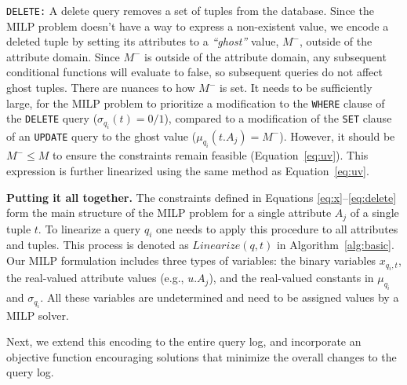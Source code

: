 \smallskip
\noindent
\texttt{DELETE:}
A delete query removes a set of tuples from the database.  
Since the MILP problem doesn't have a way to express a non-existent value,
we encode a deleted tuple by setting its attributes to a
\emph{``ghost''} value, $M^-$, outside of the attribute domain. Since $M^-$ is
outside of the attribute domain, any subsequent conditional functions will
evaluate to false, so subsequent queries do not affect ghost tuples. There are
nuances to how $M^-$ is set. It needs to be sufficiently large, for the MILP
problem to prioritize a modification to the \texttt{WHERE} clause of the
\texttt{DELETE} query ($\sigma_{q_i}(t) = 0/1$), compared to a modification of
the \texttt{SET} clause of an \texttt{UPDATE} query to the ghost value
($\mu_{q_i}(t.A_j) = M^-$). However, it should be $M^- \leq M $ to ensure the
constraints remain feasible (Equation~\ref{eq:uv}). 
This expression is further linearized using the same method as Equation~\eqref{eq:uv}.

\smallskip
\noindent
\textbf{Putting it all together.}
The constraints defined in Equations \eqref{eq:x}--\eqref{eq:delete}
form the main structure of the MILP problem for a single attribute
$A_j$ of a single tuple $t$. To linearize a query $q_i$ one needs to
apply this procedure to all attributes and tuples. This process is
denoted as $Linearize(q, t)$ in Algorithm~\ref{alg:basic}. Our MILP
formulation includes three types of variables: the binary variables
$x_{q_i, t}$, the real-valued attribute values (e.g., $u.A_j$), and
the real-valued constants in $\mu_{q_i}$ and $\sigma_{q_i}$. All these
variables are undetermined and need to be assigned values by a MILP
solver.
  

Next, we extend this encoding to the entire query log,
and incorporate an objective function encouraging solutions
that minimize the overall changes to the query log.







